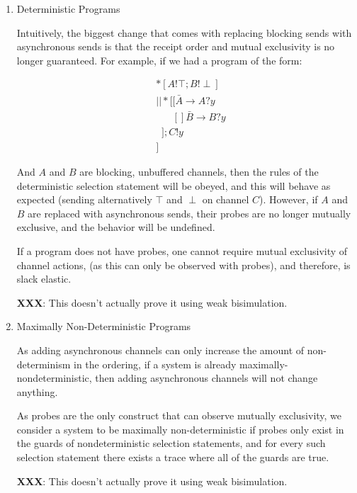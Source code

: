\documentclass[times, 10pt]{article}
\begin{document}
\begin{enumerate}

\item Deterministic Programs

Intuitively, the biggest change that comes with replacing blocking sends with asynchronous sends is that the receipt order and mutual exclusivity is no longer guaranteed.  For example, if we had a program of the form:

\begin{align*}
&*[A!\top; B!\!\perp] \\
&|| *[[ \bar{A} \rightarrow A?y \\
&\;\;\;\;\;\; [] \bar{B} \rightarrow B?y \\
&\;\;]; C!y \\
&]
\end{align*}

And $A$ and $B$ are blocking, unbuffered channels, then the rules of the deterministic selection statement will be obeyed, and this will behave as expected (sending alternatively $\top$ and $\perp$ on channel $C$).  However, if $A$ and $B$ are replaced with asynchronous sends, their probes are no longer mutually exclusive, and the behavior will be undefined. 

If a program does not have probes, one cannot require mutual exclusivity of channel actions, (as this can only be observed with probes), and therefore, is slack elastic.

\textbf{XXX}: This doesn't actually prove it using weak bisimulation.

\item Maximally Non-Deterministic Programs

As adding asynchronous channels can only increase the amount of non-determinism in the ordering, if a system is already maximally-nondeterministic, then adding asynchronous channels will not change anything.

As probes are the only construct that can observe mutually exclusivity, we consider a system to be maximally non-deterministic if probes only exist in the guards of nondeterministic selection statements, and for every such selection statement there exists a trace where all of the guards are true.

\textbf{XXX}: This doesn't actually prove it using weak bisimulation. 

\end{enumerate}




\end{document}
